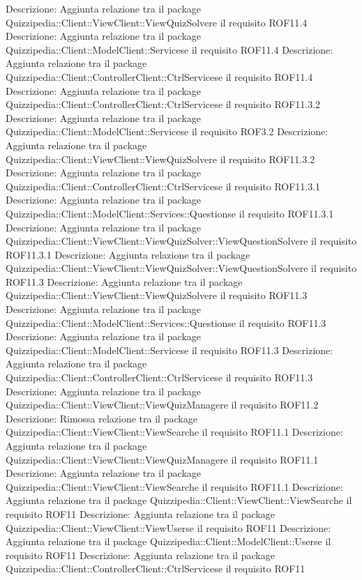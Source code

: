 Descrizione: Aggiunta relazione tra il package Quizzipedia::Client::ViewClient::ViewQuizSolvere il requisito ROF11.4 
Descrizione: Aggiunta relazione tra il package Quizzipedia::Client::ModelClient::Servicese il requisito ROF11.4 
Descrizione: Aggiunta relazione tra il package Quizzipedia::Client::ControllerClient::CtrlServicese il requisito ROF11.4 
Descrizione: Aggiunta relazione tra il package Quizzipedia::Client::ControllerClient::CtrlServicese il requisito ROF11.3.2 
Descrizione: Aggiunta relazione tra il package Quizzipedia::Client::ModelClient::Servicese il requisito ROF3.2 
Descrizione: Aggiunta relazione tra il package Quizzipedia::Client::ViewClient::ViewQuizSolvere il requisito ROF11.3.2 
Descrizione: Aggiunta relazione tra il package Quizzipedia::Client::ControllerClient::CtrlServicese il requisito ROF11.3.1 
Descrizione: Aggiunta relazione tra il package Quizzipedia::Client::ModelClient::Services::Questionse il requisito ROF11.3.1 
Descrizione: Aggiunta relazione tra il package Quizzipedia::Client::ViewClient::ViewQuizSolver::ViewQuestionSolvere il requisito ROF11.3.1 
Descrizione: Aggiunta relazione tra il package Quizzipedia::Client::ViewClient::ViewQuizSolver::ViewQuestionSolvere il requisito ROF11.3 
Descrizione: Aggiunta relazione tra il package Quizzipedia::Client::ViewClient::ViewQuizSolvere il requisito ROF11.3 
Descrizione: Aggiunta relazione tra il package Quizzipedia::Client::ModelClient::Services::Questionse il requisito ROF11.3 
Descrizione: Aggiunta relazione tra il package Quizzipedia::Client::ModelClient::Servicese il requisito ROF11.3 
Descrizione: Aggiunta relazione tra il package Quizzipedia::Client::ControllerClient::CtrlServicese il requisito ROF11.3 
Descrizione: Aggiunta relazione tra il package Quizzipedia::Client::ViewClient::ViewQuizManagere il requisito ROF11.2 
Descrizione: Rimossa relazione tra il package Quizzipedia::Client::ViewClient::ViewSearche il requisito ROF11.1 
Descrizione: Aggiunta relazione tra il package Quizzipedia::Client::ViewClient::ViewQuizManagere il requisito ROF11.1 
Descrizione: Aggiunta relazione tra il package Quizzipedia::Client::ViewClient::ViewSearche il requisito ROF11.1 
Descrizione: Aggiunta relazione tra il package Quizzipedia::Client::ViewClient::ViewSearche il requisito ROF11 
Descrizione: Aggiunta relazione tra il package Quizzipedia::Client::ViewClient::ViewUserse il requisito ROF11 
Descrizione: Aggiunta relazione tra il package Quizzipedia::Client::ModelClient::Userse il requisito ROF11 
Descrizione: Aggiunta relazione tra il package Quizzipedia::Client::ControllerClient::CtrlServicese il requisito ROF11 
